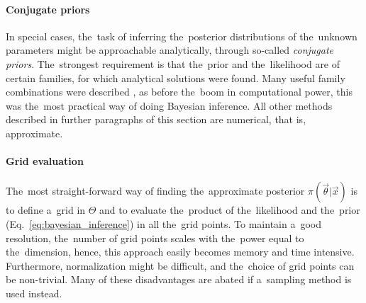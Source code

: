 \paragraph{Conjugate priors}
In special cases, the~task of inferring the~posterior distributions of the~unknown parameters might be approachable analytically, through so-called \textit{conjugate priors}. The~strongest requirement is that the~prior and the~likelihood are of certain families, for which analytical solutions were found. Many useful family combinations were described \citep{fink1997compendium}, as before the~boom in computational power, this was the~most practical way of doing Bayesian inference. All other methods described in further paragraphs of this section are numerical, that is, approximate.

\paragraph{Grid evaluation}
The~most straight-forward way of finding the~approximate posterior $\pi(\vec{\theta}|\vec{x})$ is to define a~grid in $\Theta$ and to evaluate the~product of the~likelihood and the~prior (Eq.~\ref{eq:bayesian_inference}) in all the~grid points. To maintain a~good resolution, the~number of grid points scales with the~power equal to the~dimension, hence, this approach easily becomes memory and time intensive. Furthermore, normalization might be difficult, and the~choice of grid points can be non-trivial. Many of these disadvantages are abated if a~sampling method is used instead. 

